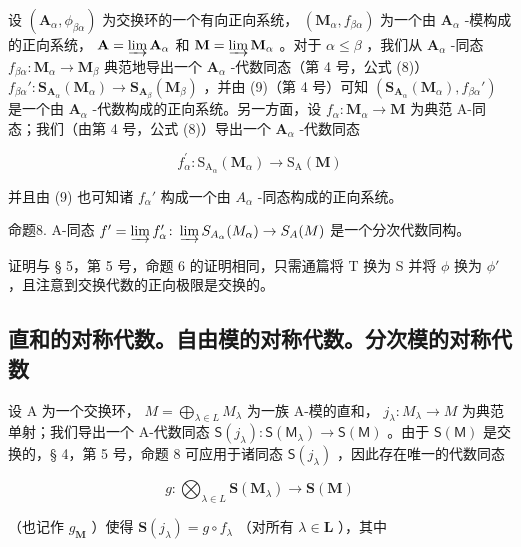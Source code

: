 设 \((\mathbf{A}_{\alpha},\phi_{\beta \alpha})\) 为交换环的一个有向正向系统， \((\mathbf{M}_{\alpha},f_{\beta \alpha})\) 为一个由 \(\mathbf{A}_{\alpha}\) -模构成的正向系统， \(\mathbf{A} = \varinjlim \mathbf{A}_{\alpha}\) 和 \(\mathbf{M} = \varinjlim \mathbf{M}_{\alpha}\) 。对于 \(\alpha \leqslant \beta\) ，我们从 \(\mathbf{A}_{\alpha}\) -同态 \(f_{\beta \alpha}: \mathbf{M}_{\alpha} \to \mathbf{M}_{\beta}\) 典范地导出一个 \(\mathbf{A}_{\alpha}\) -代数同态（第 4 号，公式 (8)） \(f_{\beta \alpha}': \mathbf{S}_{\mathbf{A}_{\alpha}}(\mathbf{M}_{\alpha}) \to \mathbf{S}_{\mathbf{A}_{\beta}}(\mathbf{M}_{\beta})\) ，并由 (9)（第 4 号）可知 \((\mathbf{S}_{\mathbf{A}_{\alpha}}(\mathbf{M}_{\alpha}), f_{\beta \alpha}')\) 是一个由 \(\mathbf{A}_{\alpha}\) -代数构成的正向系统。另一方面，设 \(f_{\alpha}: \mathbf{M}_{\alpha} \to \mathbf{M}\) 为典范 A-同态；我们（由第 4 号，公式 (8)）导出一个 \(\mathbf{A}_{\alpha}\) -代数同态

\[
f _ {\alpha} ^ {\prime}: \mathrm{S} _ {\mathrm{A} _ {\alpha}} (\mathbf {M} _ {\alpha}) \rightarrow \mathrm{S} _ {\mathrm{A}} (\mathbf {M})
\]

并且由 (9) 也可知诸 \(f_{\alpha}'\) 构成一个由 \(A_{\alpha}\) -同态构成的正向系统。

命题8. A-同态 \(f' = \varinjlim f_{\alpha}' \colon \varinjlim S_{A_{\alpha}}(M_{\alpha}) \to S_{A}(M)\) 是一个分次代数同构。

证明与 § 5，第 5 号，命题 6 的证明相同，只需通篇将 T 换为 S 并将 \(\phi\) 换为 \(\phi'\) ，且注意到交换代数的正向极限是交换的。

\subsection{直和的对称代数。自由模的对称代数。分次模的对称代数}

设 A 为一个交换环， \(M = \bigoplus_{\lambda \in L} M_{\lambda}\) 为一族 A-模的直和， \(j_{\lambda}: M_{\lambda} \to M\) 为典范单射；我们导出一个 A-代数同态 \(\mathsf{S}(j_{\lambda}): \mathsf{S}(\mathsf{M}_{\lambda}) \to \mathsf{S}(\mathsf{M})\) 。由于 \(\mathsf{S}(\mathsf{M})\) 是交换的，§ 4，第 5 号，命题 8 可应用于诸同态 \(\mathsf{S}(j_{\lambda})\) ，因此存在唯一的代数同态

\[
g \colon \bigotimes_ {\lambda \in L} \mathbf {S} (\mathbf {M} _ {\lambda}) \rightarrow \mathbf {S} (\mathbf {M})\tag{10}
\]

（也记作 \(g_{\mathbf{M}}\) ）使得 \(\mathbf{S}(j_{\lambda}) = g \circ f_{\lambda}\) （对所有 \(\lambda \in \mathbf{L}\) ），其中

